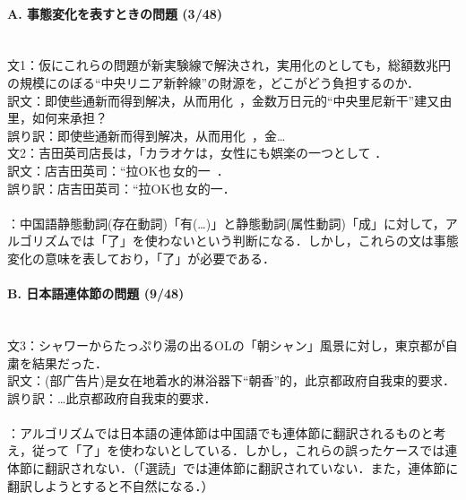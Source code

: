 \paragraph{A. 事態変化を表すときの問題 (3/48)}　\\
文1：仮にこれらの問題が新実験線で解決され，実用化のとしても，総額数兆円の規模にのぼる``中央リニア新幹線''の財源を，どこがどう負担するのか．\\
訳文：即使些通新而得到解决，从而用化\, ，金数万日元的``中央里尼新干''建又由里，如何来承担？\\
誤り訳：即使些通新而得到解决，从而用化\, ，金…\\
文2：吉田英司店長は，「カラオケは，女性にも娯楽の一つとして ．\\
訳文：店吉田英司：``拉OK也\,女的一\, ．\\
誤り訳：店吉田英司：``拉OK也\,女的一．\\
\\
：中国語静態動詞(存在動詞)「有(…)」と静態動詞(属性動詞)「成」に対して，アルゴリズムでは「了」を使わないという判断になる．しかし，これらの文は事態変化の意味を表しており，「了」が必要である．

\paragraph{B. 日本語連体節の問題 (9/48)}　\\
文3：シャワーからたっぷり湯の出るOLの「朝シャン」風景に対し，東京都が自粛を結果だった．\\
訳文：(部广告片)是女在地着水的淋浴器下``朝香''的，此京都政府自我束的要求．\\
誤り訳：…此京都政府自我束的要求．\\
\\
：アルゴリズムでは日本語の連体節は中国語でも連体節に翻訳されるものと考え，従って「了」を使わないとしている．しかし，これらの誤ったケースでは連体節に翻訳されない．（「選読」では連体節に翻訳されていない．また，連体節に翻訳しようとすると不自然になる．）

